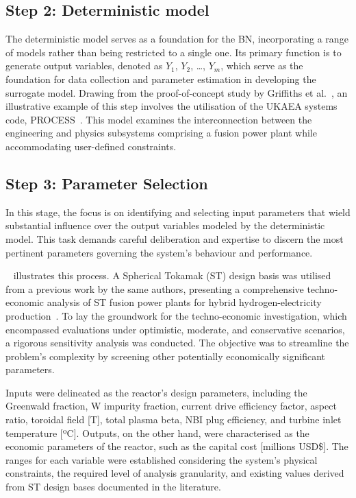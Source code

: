 \documentclass[journal]{IEEEtran}
\begin{document}
\subsection{\textbf{Step 2}: Deterministic model}\label{sec:deterministic}
The deterministic model serves as a foundation for the BN, incorporating a range of models rather than being restricted to a single one. Its primary function is to generate output variables, denoted as $Y_1$, $Y_2$, \ldots, $Y_m$, which serve as the foundation for data collection and parameter estimation in developing the surrogate model. Drawing from the proof-of-concept study by Griffiths et al.~\cite{Griffiths2024}, an illustrative example of this step involves the utilisation of the UKAEA systems code, PROCESS~\cite{Kovari2014, Kovari2016}. This model examines the interconnection between the engineering and physics subsystems comprising a fusion power plant while accommodating user-defined constraints.

\subsection{\textbf{Step 3}: Parameter Selection}\label{sec:parameters} 
In this stage, the focus is on identifying and selecting input parameters that wield substantial influence over the output variables modeled by the deterministic model. This task demands careful deliberation and expertise to discern the most pertinent parameters governing the system's behaviour and performance.

~\cite{Griffiths2024} illustrates this process. A Spherical Tokamak (ST) design basis was utilised from a previous work by the same authors, presenting a comprehensive techno-economic analysis of ST fusion power plants for hybrid hydrogen-electricity production~\cite{Hidalgo-Salaverri2023}. To lay the groundwork for the techno-economic investigation, which encompassed evaluations under optimistic, moderate, and conservative scenarios, a rigorous sensitivity analysis was conducted. The objective was to streamline the problem's complexity by screening other potentially economically significant parameters.

Inputs were delineated as the reactor's design parameters, including the Greenwald fraction, W impurity fraction, current drive efficiency factor, aspect ratio, toroidal field [T], total plasma beta, NBI plug efficiency, and turbine inlet temperature [ºC]. Outputs, on the other hand, were characterised as the economic parameters of the reactor, such as the capital cost [millions USD\$]. The ranges for each variable were established considering the system's physical constraints, the required level of analysis granularity, and existing values derived from ST design bases documented in the literature.
\end{document}
